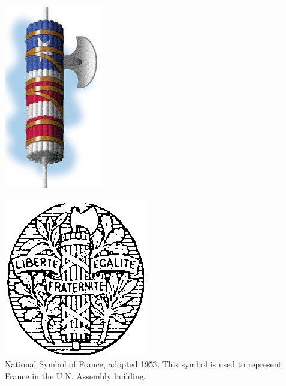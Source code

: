 \begin{frame}
    \centering
    \includegraphics[height=.8\textheight]{img/fasces/flag-fasces.jpg} \\
\end{frame}
\begin{frame}
    \centering
    \includegraphics[height=.8\textheight]{img/fasces/french-republic-symbol.png} \\
    National Symbol of France, adopted 1953. This symbol is used to represent France in the U.N. Assembly building. \\
\end{frame}
